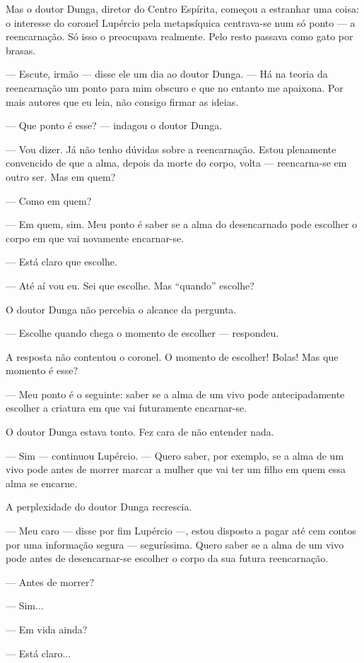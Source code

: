 Mas o doutor Dunga, diretor do Centro Espírita, começou a estranhar uma
coisa: o interesse do coronel Lupércio pela metapsíquica centrava-se num
só ponto --- a reencarnação. Só isso o preocupava realmente. Pelo resto
passava como gato por brasas.

--- Escute, irmão --- disse ele um dia ao doutor Dunga. --- Há na teoria
da reencarnação um ponto para mim obscuro e que no entanto me apaixona.
Por mais autores que eu leia, não consigo firmar as ideias.

--- Que ponto é esse? --- indagou o doutor Dunga.

--- Vou dizer. Já não tenho dúvidas sobre a reencarnação. Estou
plenamente convencido de que a alma, depois da morte do corpo, volta ---
reencarna-se em outro ser. Mas em quem?

--- Como em quem?

--- Em quem, sim. Meu ponto é saber se a alma do desencarnado pode
escolher o corpo em que vai novamente encarnar-se.

--- Está claro que escolhe.

--- Até aí vou eu. Sei que escolhe. Mas ``quando'' escolhe?

O doutor Dunga não percebia o alcance da pergunta.

--- Escolhe quando chega o momento de escolher --- respondeu.

A resposta não contentou o coronel. O momento de escolher! Bolas! Mas
que momento é esse?

--- Meu ponto é o seguinte: saber se a alma de um vivo pode
antecipadamente escolher a criatura em que vai futuramente encarnar-se.

O doutor Dunga estava tonto. Fez cara de não entender nada.

--- Sim --- continuou Lupércio. --- Quero saber, por exemplo, se a alma
de um vivo pode antes de morrer marcar a mulher que vai ter um filho em
quem essa alma se encarne.

A perplexidade do doutor Dunga recrescia.

--- Meu caro --- disse por fim Lupércio ---, estou disposto a pagar até
cem contos por uma informação segura --- seguríssima. Quero saber se a
alma de um vivo pode antes de desencarnar-se escolher o corpo da sua
futura reencarnação.

--- Antes de morrer?

--- Sim...

--- Em vida ainda?

--- Está claro...

